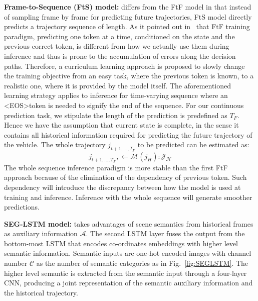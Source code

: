 \documentclass[10pt,twocolumn,letterpaper]{article}
\begin{document}
\vspace{\baselineskip}
\noindent \textbf{Frame-to-Sequence (FtS) model:}
differs from the FtF model in that instead of sampling frame by frame for predicting future trajectories, FtS model directly predicts a trajectory sequence of length.
As it pointed out in~\cite{bengio2015scheduled} that FtF training paradigm, predicting one token at a time, conditioned on the state and the previous correct token, is different from how we actually use them during inference and thus is prone to the accumulation of errors along the decision paths. 
Therefore, a curriculum learning approach is proposed to slowly change the training objective from an easy task, where the previous token is known, to a realistic one, where it is provided by the model itself.
The aforementioned learning strategy applies to inference for time-varying sequence where an \textless EOS\textgreater token is needed to signify the end of the sequence.
For our continuous prediction task, we stipulate the length of the prediction is predefined as $T_F$.
Hence we have the assumption that current state is complete, in the sense it contains all historical information required for predicting the future trajectory of the vehicle. 
The whole trajectory  $j_{t+1, \ldots, T_F}$ to be predicted can be estimated as:
\begin{equation}
j_{t+1, \ldots, T_F}, \leftarrow  \bm{\mathcal{M}}(j_H): \mathcal{J_H}
\label{eq:FtS}
\end{equation}
The whole sequence inference paradigm is more stable than the first FtF approach because of the elimination of the dependency of previous token. Such dependency will introduce the discrepancy between how the model is used at training and inference. Inference with the whole sequence will generate smoother predictions.






\vspace{\baselineskip}
\noindent \textbf{SEG-LSTM model:}
 takes advantages of scene semantics from  historical frames as auxiliary information $\mathcal{A}$. The second LSTM layer fuses the output from the bottom-most LSTM that encodes co-ordinates embeddings with higher level semantic information. Semantic inputs are one-hot encoded images with channel number $\mathcal{C}$ as the number of semantic categories  as in Fig.~\ref{fig:SEGLSTM}. The higher level semantic is extracted from the semantic input through a four-layer CNN, producing a joint representation of the semantic auxiliary information and the historical trajectory.
 
\end{document}
